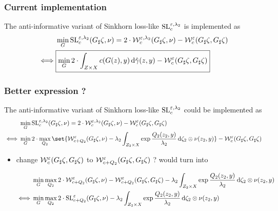 \documentclass[11pt,a4paper]{article}
\begin{document}
\subsubsection{Current implementation}

The anti-informative variant of Sinkhorn loss-like $\mathrm{SL}_{c}^{\varepsilon, \lambda_2}$ is implemented as
\begin{align}
    &\min_{G} \SLace(\pf{G}{\zeta}, \nu) = 2 \cdot \Wace(\pf{G}{\zeta}, \nu) - \Wce(\pf{G}{\zeta}, \pf{G}{\zeta}) \\%
\iff &\boxed{\min_{G} 2 \cdot \int_{\ZX}c(G(z), y) \d \gammah(z, y) - \Wce(\pf{G}{\zeta}, \pf{G}{\zeta})}
\end{align}

\subsubsection{Better expression ?}

The anti-informative variant of Sinkhorn loss-like $\mathrm{SL}_{c}^{\varepsilon, \lambda_2}$ could be implemented as
\begin{align}
    &\min_{G} \SLace(\pf{G}{\zeta}, \nu) = 2 \cdot \Wace(\pf{G}{\zeta}, \nu) - \Wce(\pf{G}{\zeta}, \pf{G}{\zeta}) \\%
\iff &\min_{G} 2 \cdot \max_{Q_2}\set{ \W_{c + Q_2}^{\eps}(\pf{G}{\zeta}, \nu)- \lambda_2 \int_{\ZBX}{\exp{\frac{Q_2(z_2, y)}{\lambda_2}} \d \oprod{\zeta_2 }{\nu (z_2, y)}}} - \Wce(\pf{G}{\zeta}, \pf{G}{\zeta})
\end{align}

\begin{rems}
    \begin{itemize}
        \item change $\mathcal{W}_{c}^{\varepsilon}({G}_{\sharp}{\zeta}, {G}_{\sharp}\zeta)$ to $\mathcal{W}_{c+Q_2}^{\varepsilon}({G}_{\sharp}{\zeta}, {G}_{\sharp}\zeta)$ ? would turn into

\begin{align}
    &\min_{G} \max_{Q_2} 2 \cdot\mathcal{W}_{c + Q_2}^{\varepsilon}({G}_{\sharp}{\zeta}, \nu)- \mathcal{W}_{c+Q_2}^{\varepsilon}({G}_{\sharp}{\zeta}, {G}_{\sharp}\zeta) - \lambda_2 \int_{Z_2 \times X}{\exp{\frac{Q_2(z_2, y)}{\lambda_2}} \, \mathrm{d} {\zeta_2  \otimes \nu (z_2, y)}} \\
    \iff & \min_{G}\max_{Q_2} 2 \cdot \mathrm{SL}_{c+Q_2}^{\varepsilon}({G}_{\sharp}{\zeta}, \nu)- \lambda_2 \int_{Z_2 \times X}{\exp{\frac{Q_2(z_2, y)}{\lambda_2}} \, \mathrm{d} {\zeta_2  \otimes \nu (z_2, y)}}
\end{align}
    \end{itemize}
\end{rems}

\printbibliography{}
\end{document}
